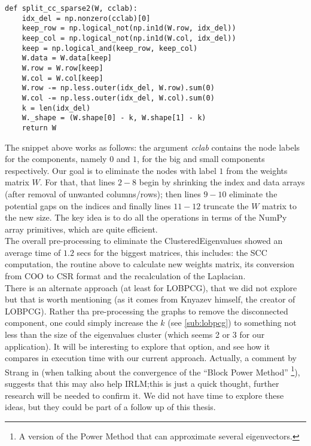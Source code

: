     \begin{lstlisting}
def split_cc_sparse2(W, cclab):
    idx_del = np.nonzero(cclab)[0]
    keep_row = np.logical_not(np.in1d(W.row, idx_del))
    keep_col = np.logical_not(np.in1d(W.col, idx_del))
    keep = np.logical_and(keep_row, keep_col)
    W.data = W.data[keep]
    W.row = W.row[keep]
    W.col = W.col[keep]
    W.row -= np.less.outer(idx_del, W.row).sum(0)
    W.col -= np.less.outer(idx_del, W.col).sum(0)
    k = len(idx_del)
    W._shape = (W.shape[0] - k, W.shape[1] - k)
    return W
    \end{lstlisting}
    \joinbelow{1cm}
    
The snippet above works as follows: the argument
\emph{cclab} contains the node labels for the components, namely $0$ and $1$,
for the big and small components respectively. Our goal is to
eliminate the nodes with 
label $1$ from the weights matrix $W$. For that, that lines $2-8$
begin by shrinking the index and data arrays (after removal of unwanted
columns/rows); then lines $9-10$ eliminate the potential gaps on the
indices and finally lines $11-12$ truncate the $W$ matrix to the new
size. The key idea is to do all the operations in terms of the NumPy
\cite{numpy} array primitives, which are quite efficient. \\

The overall pre-processing to eliminate the \gls{ClusteredEigenvalues} 
showed an average time of $1.2$ secs for the biggest
matrices, this includes: the \gls{SCC} computation, the routine above
to calculate new weights matrix, its conversion from COO
to CSR format and the recalculation of the \gls{Laplacian}. \\

There is an alternate approach (at least for \gls{LOBPCG}), that we
did not explore but that is worth mentioning (as it comes from Knyazev
himself, the creator of \gls{LOBPCG}). Rather tha pre-processing the
graphs to remove the disconnected component, one could simply
increase the $k$ (see \cref{sub:lobpcg}) to something not less than
the size of the eigenvalues cluster (which  
seems 2 or 3 for our application). It will be interesting to 
explore that option, and see how it compares in execution time
with our current approach. Actually, a comment by Strang in
\cite{strang88} (when talking about the convergence of the ``Block
Power Method'' \footnote{A version of the Power Method that can
  approximate several eigenvectors.}), suggests that this may
also help \gls{IRLM};this is 
just a quick thought, further research will be needed to confirm
it. We did not have time to explore these ideas, but they could be part of
a follow up of this thesis.

